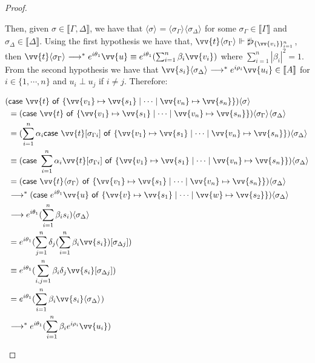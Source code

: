\documentclass[runningheads,orivec,envcountsame,envcountsect]{llncs}
\newcommand\lra{\longrightarrow}
\newcommand\ansubst[2]{\ensuremath{\langle #1 \rangle_{#2}}}
\def\gencase#1#2#3#4#5{\ensuremath{\mathsf{case}~#1~\mathsf{of}~\{#2\mapsto #4 \mid \dotsb \mid #3\mapsto #5\}}}
\def\eval{\lra^*}
\def\sem#1{\llbracket#1\rrbracket}
\def\real{\Vdash}
\newcommand\basis[1]{\ensuremath{\flat_{#1}}}
\newcommand\genbasis[3]{\ensuremath{\basis{\{#1\}_{#2}^{#3}}}}
\begin{document}
\begin{proof}
\begin{description}
    Then, given $\sigma\in\sem{\Gamma,\Delta}$, we have that $\ansubst{\sigma}{}=\ansubst{\sigma_\Gamma}{}\ansubst{\sigma_\Delta}{}$ for some $\sigma_\Gamma\in\sem{\Gamma}$ and $\sigma_\Delta\in\sem{\Delta}$. Using the first hypothesis we have that, $\vv{t}\ansubst{\sigma_\Gamma}{}\real\sharp\genbasis{\vv{v_i}}{i=1}{n}$, then $\vv{t}\ansubst{\sigma_\Gamma}{}\eval e^{i\theta_1} \vv{u}\equiv e^{i\theta_1} (\sum_{i=1}^{n}\beta_i \vv{v_i})$ where $\sum_{i=1}^{n}|\beta_i|^2=1$. From the second hypothesis we have that $\vv{s_i}\ansubst{\sigma_\Delta}{}\eval e^{i\rho_i} \vv{u_i}\in\sem{A}$ for $i\in\{1,\dotsb ,n\}$ and $u_i\perp u_j$ if $i\neq j$. Therefore:

    \begin{align*}
        (&\gencase{\vv{t}}{\vv{v_1}}{\vv{v_n}}{\vv{s_1}}{\vv{s_n}})\ansubst{\sigma}{}\\ 
        &= (\gencase{\vv{t}}{\vv{v_1}}{\vv{v_n}}{\vv{s_1}}{\vv{s_n}})\ansubst{\sigma_\Gamma}{}\ansubst{\sigma_\Delta}{}\\
        &=(\sum_{i=1}^{n}\alpha_i \gencase{\vv{t}[\sigma_{\Gamma i}]}{\vv{v_1}}{\vv{v_n}}{\vv{s_1}}{\vv{s_n}})\ansubst{\sigma_\Delta}{} \\
        &\equiv (\gencase{\sum_{i=1}^{n} \alpha_i \vv{t}[\sigma_{\Gamma i}]}{\vv {v_1}}{\vv{v_n}}{\vv{s_1}}{\vv{s_n}})\ansubst{\sigma_\Delta}{}\\
        &=(\gencase{\vv{t}\ansubst{\sigma_\Gamma}{}}{\vv{v_1}}{\vv{v_n}}{\vv{s_1}}{\vv{s_n}})\ansubst{\sigma_\Delta}{}\\
        &\eval(\gencase{e^{i\theta_1} \vv{u}}{\vv{v}}{\vv{w}}{\vv{s_1}}{\vv{s_2}})\ansubst{\sigma_\Delta}{}\\
        &\lra e^{i\theta_1} (\sum_{i=1}^{n}\beta_i s_i)\ansubst{\sigma_\Delta}{}\\
        &= e^{i\theta_1} (\sum_{j=1}^{n}\delta_j (\sum_{i=1}^{n}\beta_i \vv{s_i})[\sigma_{\Delta j}])\\
        &\equiv e^{i\theta_1} (\sum_{i,j=1}^{n}\beta_i\delta_j\vv{s_i}[\sigma_{\Delta j}])\\
        &= e^{i\theta_1} (\sum_{i=1}^{n}\beta_i \vv{s_i}\ansubst{\sigma_\Delta}{})\\
        &\eval e^{i\theta_1} (\sum_{i=1}^{n}\beta_i e^{i\rho_i} \vv{u_i})
    \end{align*}
    

\end{description}
\end{proof}
\end{document}
